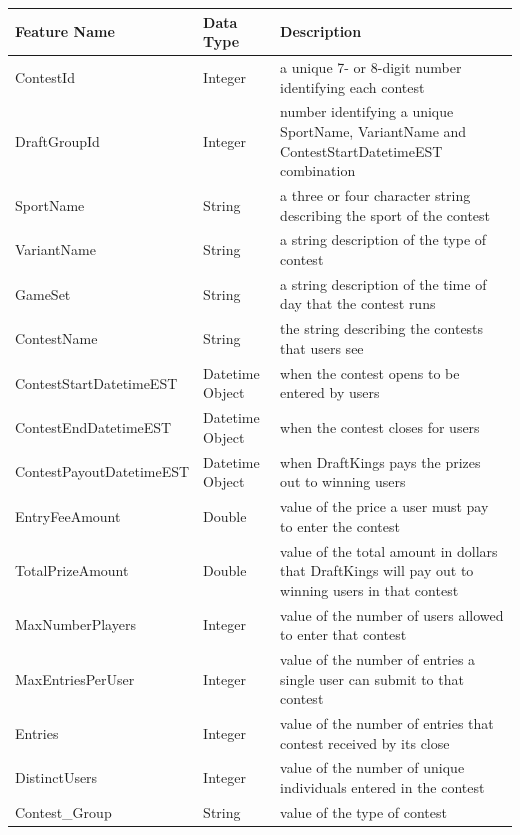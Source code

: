 \begin{table}
\centering
\begin{tabular}{|p{5cm}|p{1.6cm}|p{9.5cm}|}
\hline
 \textbf{Feature Name} & \textbf{Data Type} & \textbf{Description}  \\ 
    \hline
    ContestId & Integer & a unique 7- or 8-digit number identifying each contest \\
    \hline
    DraftGroupId & Integer & number identifying a unique SportName, VariantName and ContestStartDatetimeEST combination\\ %
    \hline
    SportName & String & a three or four character string describing the sport of the contest\\
    \hline
    VariantName & String & a string description of the type of contest \\
    \hline
    GameSet & String & a string description of the time of day that the contest runs \\
    \hline
    ContestName & String & the string describing the contests that users see \\
    \hline
    ContestStartDatetimeEST & Datetime Object & when the contest opens to be entered by users \\
    \hline
    ContestEndDatetimeEST & Datetime Object & when the contest closes for users \\
    \hline
    ContestPayoutDatetimeEST & Datetime Object & when DraftKings pays the prizes out to winning users \\
    \hline
    EntryFeeAmount & Double & value of the price a user must pay to enter the contest \\
    \hline
    TotalPrizeAmount & Double & value of the total amount in dollars that DraftKings will pay out to winning users in that contest \\
    \hline
    MaxNumberPlayers & Integer & value of the number of users allowed to enter that contest \\
    \hline
    MaxEntriesPerUser & Integer & value of the number of entries a single user can submit to that contest \\
    \hline
    Entries & Integer & value of the number of entries that contest received by its close \\
    \hline
    DistinctUsers & Integer & value of the number of unique individuals entered in the contest \\
    \hline
    Contest\_Group & String & value of the type of contest \\

\end{tabular}
\end{table}
